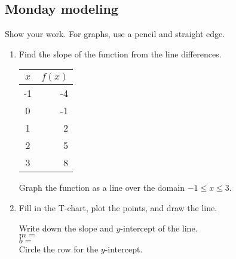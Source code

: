 \documentclass[12pt, oneside]{article}
\begin{document}
\subsection*{Monday modeling}
Show your work. For graphs, use a pencil and straight edge.
  \begin{enumerate}

\subsubsection*{Graphing linear functions}

\item Find the slope of the function from the line differences.
    \begin{center}
      \begin{tabular}{|c|r|}
      \hline
      $x$ & $f(x)$\\
      \hline
      -1 & -4 \\
      \hline
      0 & -1 \\
      \hline
      1 & 2 \\
      \hline
      2 & 5 \\
      \hline
      3 & 8 \\
      \hline
      \end{tabular}
    \end{center}
Graph the function as a line over the domain $-1 \leq x \leq 3$.

\begin{center} %
\end{center}

\newpage

\item Fill in the T-chart, plot the points, and draw the line.

    \begin{center} %
    \end{center}
Write down the slope and $y$-intercept of the line.\\[0.5cm]
$m=$\\[0.5cm]
$b=$\\[0.5cm]
Circle the row for the $y$-intercept.



\end{enumerate}
\end{document}
